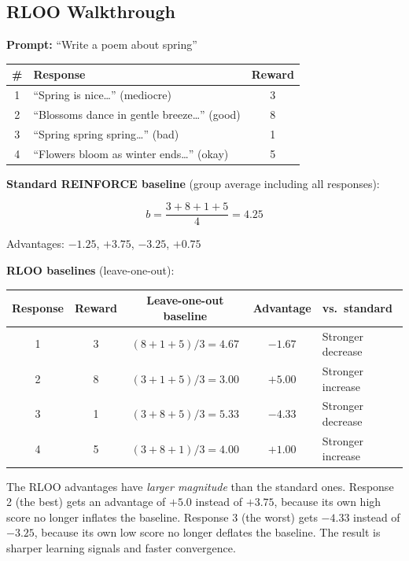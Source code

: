 \begin{chapterenv}
\subsection{RLOO Walkthrough}

\textbf{Prompt:} ``Write a poem about spring''

\begin{center}
\begin{tabular}{clc}
\toprule
\textbf{\#} & \textbf{Response} & \textbf{Reward} \\
\midrule
1 & ``Spring is nice\ldots'' (mediocre) & 3 \\
2 & ``Blossoms dance in gentle breeze\ldots'' (good) & 8 \\
3 & ``Spring spring spring\ldots'' (bad) & 1 \\
4 & ``Flowers bloom as winter ends\ldots'' (okay) & 5 \\
\bottomrule
\end{tabular}
\end{center}

\textbf{Standard REINFORCE baseline} (group average including all responses):

$$b = \frac{3 + 8 + 1 + 5}{4} = 4.25$$

Advantages: $-1.25$, $+3.75$, $-3.25$, $+0.75$

\textbf{RLOO baselines} (leave-one-out):

\begin{center}
\begin{tabular}{ccccl}
\toprule
\textbf{Response} & \textbf{Reward} & \textbf{Leave-one-out baseline} & \textbf{Advantage} & \textbf{vs.\ standard} \\
\midrule
1 & 3 & $(8+1+5)/3 = 4.67$ & $-1.67$ & Stronger decrease \\
2 & 8 & $(3+1+5)/3 = 3.00$ & $+5.00$ & Stronger increase \\
3 & 1 & $(3+8+5)/3 = 5.33$ & $-4.33$ & Stronger decrease \\
4 & 5 & $(3+8+1)/3 = 4.00$ & $+1.00$ & Stronger increase \\
\bottomrule
\end{tabular}
\end{center}

The RLOO advantages have \textit{larger magnitude} than the standard ones. Response 2 (the best) gets an advantage of $+5.0$ instead of $+3.75$, because its own high score no longer inflates the baseline. Response 3 (the worst) gets $-4.33$ instead of $-3.25$, because its own low score no longer deflates the baseline. The result is sharper learning signals and faster convergence.


\end{chapterenv}
